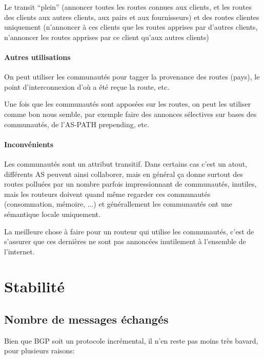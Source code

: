 \documentclass{report}
\begin{document}
Le transit ``plein'' (annoncer toutes les routes connues aux clients,
et les routes des clients aux autres clients, aux pairs et aux
fournisseurs) et des routes clientes uniquement (n'annoncer à ces
clients que les routes apprises par d'autres clients, n'annoncer les
routes apprises par ce client qu'aux autres clients)

\paragraph{Autres utilisations}

On peut utiliser les communautés pour tagger la provenance des routes
(pays), le point d'interconnexion d'où a été reçue la route, etc.

Une fois que les communautés sont apposées sur les routes, on peut les
utiliser comme bon nous semble, par exemple faire des annonces
sélectives sur bases des communautés, de l'AS-PATH prepending, etc.

\paragraph{Inconvénients}

Les communautés sont un attribut transitif. Dans certains cas c'est un
atout, différents AS peuvent ainsi collaborer, mais en général ça
donne surtout des routes polluées par un nombre parfois impressionnant
de communautés, inutiles, mais les routeurs doivent quand même
regarder ces communautés (consommation, mémoire, ...) et générallement
les communautés ont une sémantique locale uniquement.

La meilleure chose à faire pour un routeur qui utilise les
communautés, c'est de s'assurer que ces dernières ne sont pas
annoncées inutilement à l'ensemble de l'internet.

\section{Stabilité}

\subsection{Nombre de messages échangés}

Bien que BGP soit un protocole incrémental, il n'en reste pas moins
très bavard, pour plusieurs raisons:
\end{document}
